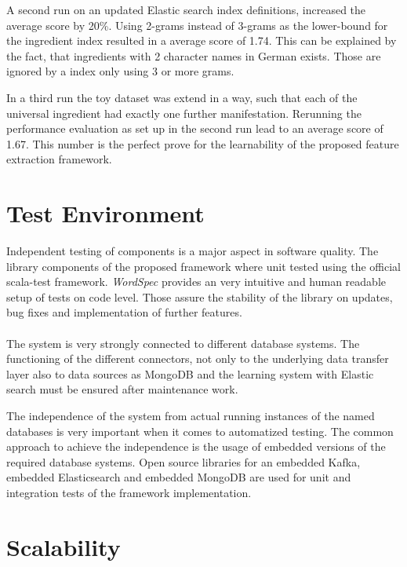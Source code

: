 A second run on an updated Elastic search index definitions, increased the average score by 20\%. Using 2-grams instead of 3-grams as the lower-bound for the ingredient index resulted in a average score of 1.74. This can be explained by the fact, that ingredients with 2 character names in German exists. Those are ignored by a index only using 3 or more grams.

In a third run the toy dataset was extend in a way, such that each of the universal ingredient had exactly one further manifestation. Rerunning the performance evaluation as set up in the second run lead to an average score of 1.67. This number is the perfect prove for the learnability of the proposed feature extraction framework.

\section{Test Environment\label{sec:testenvir}}

Independent testing of components is a major aspect in software quality. The library components of the proposed framework where unit tested using the official scala-test framework. \textit{WordSpec} provides an very intuitive and human readable setup of tests on code level. Those assure the stability of the library on updates, bug fixes and implementation of further features. \\\\
The system is very strongly connected to different database systems. The functioning of the different connectors, not only to the underlying data transfer layer also to data sources as MongoDB and the learning system with Elastic search must be ensured after maintenance work. 

The independence of the system from actual running instances of the named databases is very important when it comes to automatized testing. The common approach to achieve the independence is the usage of embedded versions of the required database systems. Open source libraries for an embedded Kafka, embedded Elasticsearch and embedded MongoDB are used for unit and integration tests of the framework implementation.


\section{Scalability\label{sec:scal}}


